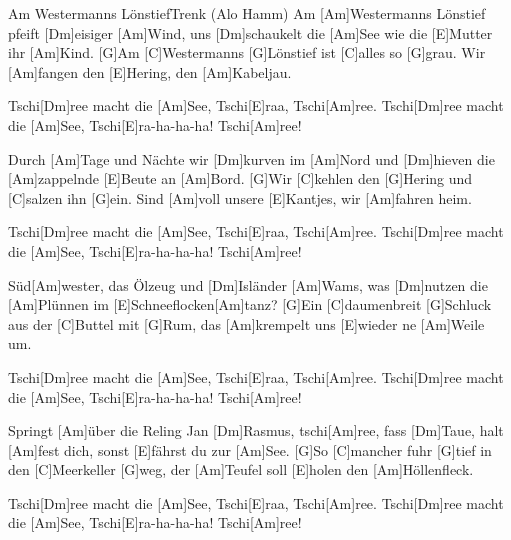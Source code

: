 \documentclass[../main.tex]{subfiles}
\begin{document}
\begin{song}{Am Westermanns Lönstief}{Trenk (Alo Hamm)}{}
Am [Am]Westermanns Lönstief pfeift [Dm]eisiger [Am]Wind,
uns [Dm]schaukelt die [Am]See wie die [E]Mutter ihr [Am]Kind.
[G]Am [C]Westermanns [G]Lönstief ist [C]alles so [G]grau.
Wir [Am]fangen den [E]Hering, den [Am]Kabeljau.

Tschi[Dm]ree macht die [Am]See, Tschi[E]raa, Tschi[Am]ree.
Tschi[Dm]ree macht die [Am]See, Tschi[E]ra-ha-ha-ha! Tschi[Am]ree!

Durch [Am]Tage und Nächte wir [Dm]kurven im [Am]Nord
und [Dm]hieven die [Am]zappelnde [E]Beute an [Am]Bord.
[G]Wir [C]kehlen den [G]Hering und [C]salzen ihn [G]ein.
Sind [Am]voll unsere [E]Kantjes, wir [Am]fahren heim.

Tschi[Dm]ree macht die [Am]See, Tschi[E]raa, Tschi[Am]ree.
Tschi[Dm]ree macht die [Am]See, Tschi[E]ra-ha-ha-ha! Tschi[Am]ree!

Süd[Am]wester, das Ölzeug und [Dm]Isländer [Am]Wams,
was [Dm]nutzen die [Am]Plünnen im [E]Schneeflocken[Am]tanz?
[G]Ein [C]daumenbreit [G]Schluck aus der [C]Buttel mit [G]Rum,
das [Am]krempelt uns [E]wieder ne [Am]Weile um.

Tschi[Dm]ree macht die [Am]See, Tschi[E]raa, Tschi[Am]ree.
Tschi[Dm]ree macht die [Am]See, Tschi[E]ra-ha-ha-ha! Tschi[Am]ree!

Springt [Am]{ü}ber die Reling Jan [Dm]Rasmus, tschi[Am]ree,
fass [Dm]Taue, halt [Am]fest dich, sonst [E]fährst du zur [Am]See.
[G]So [C]mancher fuhr [G]tief in den [C]Meerkeller [G]weg,
der [Am]Teufel soll [E]holen den [Am]Höllenfleck.

Tschi[Dm]ree macht die [Am]See, Tschi[E]raa, Tschi[Am]ree.
Tschi[Dm]ree macht die [Am]See, Tschi[E]ra-ha-ha-ha! Tschi[Am]ree!
\end{song}
\end{document}
